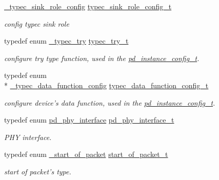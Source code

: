 \begin{DoxyCompactItemize}
\hyperlink{group__usb__pd__stack_ga6ba6df5e492767ce7ac52bafddd8849d}{\-\_\-typec\-\_\-sink\-\_\-role\-\_\-config} \hyperlink{group__usb__pd__stack_gaa91aa4484c581bbfab49d099b848ccf3}{typec\-\_\-sink\-\_\-role\-\_\-config\-\_\-t}
\begin{DoxyCompactList}\small\item\em config typec sink role \end{DoxyCompactList}\item 
typedef enum \hyperlink{group__usb__pd__stack_ga4794fa8903a011ba6f0be0f04925411e}{\-\_\-typec\-\_\-try} \hyperlink{group__usb__pd__stack_ga86c3c8c95607b75c0c75cd2714487497}{typec\-\_\-try\-\_\-t}
\begin{DoxyCompactList}\small\item\em configure try type function, used in the \hyperlink{group__usb__pd__stack_gafa6034f9e204836697da1f2fc996cbad}{pd\-\_\-instance\-\_\-config\-\_\-t}. \end{DoxyCompactList}\item 
typedef enum \\*
\hyperlink{group__usb__pd__stack_gacc3677fc21b76efa77ae5f744194394a}{\-\_\-typec\-\_\-data\-\_\-function\-\_\-config} \hyperlink{group__usb__pd__stack_ga92476c6b5b34316ccb766c9d2cadd29e}{typec\-\_\-data\-\_\-function\-\_\-config\-\_\-t}
\begin{DoxyCompactList}\small\item\em configure device's data function, used in the \hyperlink{group__usb__pd__stack_gafa6034f9e204836697da1f2fc996cbad}{pd\-\_\-instance\-\_\-config\-\_\-t}. \end{DoxyCompactList}\item 
typedef enum \hyperlink{group__usb__pd__stack_ga4aed694f998da91dea8d218596d65c1e}{pd\-\_\-phy\-\_\-interface} \hyperlink{group__usb__pd__stack_ga0499cb1eb2ad70e8d155ff72b50c7a38}{pd\-\_\-phy\-\_\-interface\-\_\-t}
\begin{DoxyCompactList}\small\item\em P\-H\-Y interface. \end{DoxyCompactList}\item 
typedef enum \hyperlink{group__usb__pd__stack_ga7a924235403e0acab44d01e720091aa1}{\-\_\-start\-\_\-of\-\_\-packet} \hyperlink{group__usb__pd__stack_ga59170ea474bbce078de8ffb3eea617aa}{start\-\_\-of\-\_\-packet\-\_\-t}
\begin{DoxyCompactList}\small\item\em start of packet's type. \end{DoxyCompactList}\item 

\end{DoxyCompactItemize}
